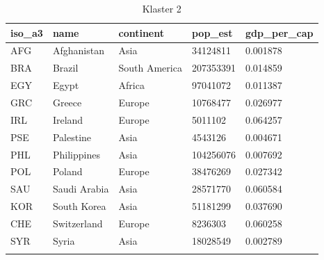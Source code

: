 \documentclass[11pt]{report}
\begin{document}
    \begin{table}[]
        \caption {Klaster 2} \label{tab:cl2}
        \begin{tabular}{lllll}
            \hline
            \multicolumn{1}{|l|}{iso\_a3} & \multicolumn{1}{l|}{name} & \multicolumn{1}{l|}{continent} & \multicolumn{1}{l|}{pop\_est} & \multicolumn{1}{l|}{gdp\_per\_cap} \\ \hline
            AFG                           & Afghanistan               & Asia                           & 34124811                      & 0.001878                           \\
            BRA                           & Brazil                    & South America                  & 207353391                     & 0.014859                           \\
            EGY                           & Egypt                     & Africa                         & 97041072                      & 0.011387                           \\
            GRC                           & Greece                    & Europe                         & 10768477                      & 0.026977                           \\
            IRL                           & Ireland                   & Europe                         & 5011102                       & 0.064257                           \\
            PSE                           & Palestine                 & Asia                           & 4543126                       & 0.004671                           \\
            PHL                           & Philippines               & Asia                           & 104256076                     & 0.007692                           \\
            POL                           & Poland                    & Europe                         & 38476269                      & 0.027342                           \\
            SAU                           & Saudi Arabia              & Asia                           & 28571770                      & 0.060584                           \\
            KOR                           & South Korea               & Asia                           & 51181299                      & 0.037690                           \\
            CHE                           & Switzerland               & Europe                         & 8236303                       & 0.060258                           \\
            SYR                           & Syria                     & Asia                           & 18028549                      & 0.002789                           \\
            &                           &                                &                               &
        \end{tabular}
    \end{table}
\end{document}

